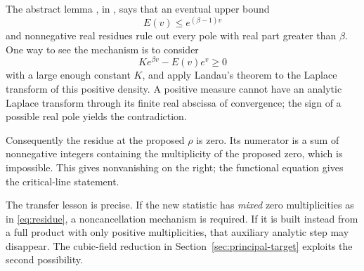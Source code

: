 The abstract lemma , in , says that an eventual upper bound
\[
E(v)\le e^{(\beta-1)v}
\]
and nonnegative real residues rule out every pole with real part greater than \(\beta\). One way to see the mechanism is to consider
\[
K e^{\beta v}-E(v)e^v\ge0
\]
with a large enough constant \(K\), and apply Landau's theorem to the Laplace transform of this positive density. A positive measure cannot have an analytic Laplace transform through its finite real abscissa of convergence; the sign of a possible real pole yields the contradiction.

Consequently the residue at the proposed \(\rho\) is zero. Its numerator is a sum of nonnegative integers containing the multiplicity of the proposed zero, which is impossible. This gives nonvanishing on the right; the functional equation gives the critical-line statement.

The transfer lesson is precise. If the new statistic has \emph{mixed} zero multiplicities as in \eqref{eq:residue}, a noncancellation mechanism is required. If it is built instead from a full product with only positive multiplicities, that auxiliary analytic step may disappear. The cubic-field reduction in Section~\ref{sec:principal-target} exploits the second possibility.

